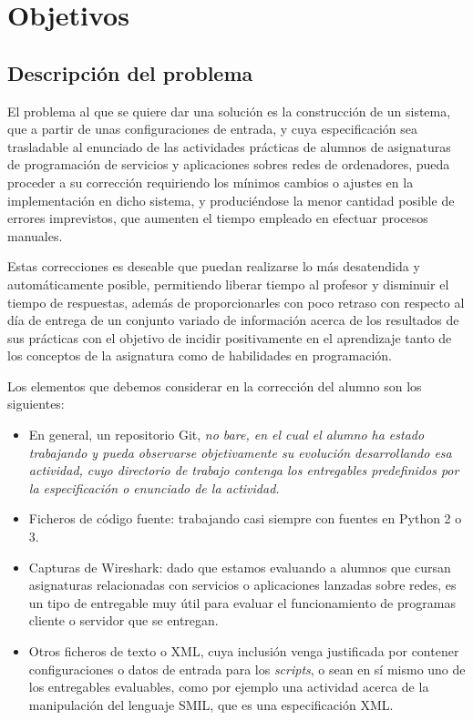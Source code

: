 \cleardoublepage
\chapter{Objetivos}
\label{chap:objetivos}


\section{Descripción del problema}
\label{sec:des_problema}


El problema al que se quiere dar una solución es la construcción de un sistema, que a partir de unas configuraciones de entrada, y cuya especificación sea trasladable al enunciado de las actividades prácticas de alumnos de asignaturas de programación de servicios y aplicaciones sobres redes de ordenadores, pueda proceder a su corrección requiriendo los mínimos cambios o ajustes en la implementación en dicho sistema, y produciéndose la menor cantidad posible de errores imprevistos, que aumenten el tiempo empleado en efectuar procesos manuales.


Estas correcciones es deseable que puedan realizarse lo más desatendida y automáticamente posible, permitiendo liberar tiempo al profesor y disminuir el tiempo de respuestas, además de proporcionarles con poco retraso con respecto al día de entrega de un conjunto variado de información acerca de los resultados de sus prácticas con el objetivo de incidir positivamente en el aprendizaje tanto de los conceptos de la asignatura como de habilidades en programación.


Los elementos que debemos considerar en la corrección del alumno son los siguientes:

\begin{itemize}
\item En general, un repositorio Git, \it{no bare}, en el cual el alumno ha estado trabajando y pueda observarse objetivamente su evolución desarrollando esa actividad, cuyo directorio de trabajo contenga los entregables predefinidos por la especificación o enunciado de la actividad.

\item Ficheros de código fuente: trabajando casi siempre con fuentes en Python 2 o 3.

\item Capturas de Wireshark: dado que estamos evaluando a alumnos que cursan asignaturas relacionadas con servicios o aplicaciones lanzadas sobre redes, es un tipo de entregable muy útil para evaluar el funcionamiento de programas cliente o servidor que se entregan.

\item Otros ficheros de texto o XML, cuya inclusión venga justificada por contener configuraciones o datos de entrada para los \textit{scripts}, o sean en sí mismo uno de los entregables evaluables, como por ejemplo una actividad acerca de la manipulación del lenguaje SMIL, que es una especificación XML.
\end{itemize}


